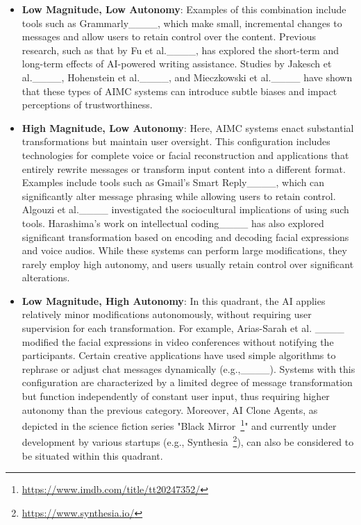 \begin{itemize}
    
    \item \textbf{Low Magnitude, Low Autonomy}: Examples of this combination include tools such as Grammarly____, which make small, incremental changes to messages and allow users to retain control over the content. Previous research, such as that by Fu et al.____, has explored the short-term and long-term effects of AI-powered writing assistance. Studies by Jakesch et al.____, Hohenstein et al.____, and Mieczkowski et al.____ have shown that these types of AIMC systems can introduce subtle biases and impact perceptions of trustworthiness.

    \item \textbf{High Magnitude, Low Autonomy}: Here, AIMC systems enact substantial transformations but maintain user oversight. This configuration includes technologies for complete voice or facial reconstruction and applications that entirely rewrite messages or transform input content into a different format. Examples include tools such as Gmail's Smart Reply____, which can significantly alter message phrasing while allowing users to retain control. Algouzi et al.____ investigated the sociocultural implications of using such tools. Harashima's work on intellectual coding____ has also explored significant transformation based on encoding and decoding facial expressions and voice audios. While these systems can perform large modifications, they rarely employ high autonomy, and users usually retain control over significant alterations.
    
    \item \textbf{Low Magnitude, High Autonomy}: In this quadrant, the AI applies relatively minor modifications autonomously, without requiring user supervision for each transformation. For example, Arias-Sarah et al. ____  modified the facial expressions in video conferences without notifying the participants. Certain creative applications have used simple algorithms to rephrase or adjust chat messages dynamically (e.g.,____). Systems with this configuration are characterized by a limited degree of message transformation but function independently of constant user input, thus requiring higher autonomy than the previous category. Moreover, AI Clone Agents, as depicted in the science fiction series "Black Mirror~\footnote{\url{https://www.imdb.com/title/tt20247352/}}" and currently under development by various startups (e.g., Synthesia~\footnote{\url{https://www.synthesia.io/}}), can also be considered to be situated within this quadrant.
    

\end{itemize}

